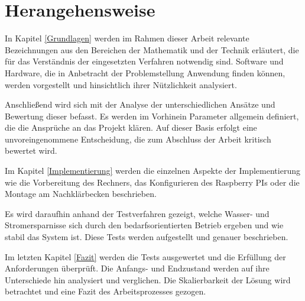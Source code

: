 \section{Herangehensweise}


In Kapitel \ref{Grundlagen} werden im Rahmen dieser Arbeit relevante Bezeichnungen aus den Bereichen der Mathematik und der Technik erläutert, die für das Verständnis der eingesetzten Verfahren notwendig sind. Software und Hardware, die in Anbetracht der Problemstellung Anwendung finden können, werden vorgestellt und hinsichtlich ihrer Nützlichkeit analysiert.

Anschließend wird sich mit der Analyse der unterschiedlichen Ansätze und Bewertung dieser befasst. Es werden im Vorhinein Parameter allgemein definiert, die die Ansprüche an das Projekt klären. Auf dieser Basis erfolgt eine unvoreingenommene Entscheidung, die zum Abschluss der Arbeit kritisch bewertet wird. 

Im Kapitel \ref{Implementierung} werden die einzelnen Aspekte der Implementierung wie die Vorbereitung des Rechners, das Konfigurieren des Raspberry PIs oder die Montage am Nachklärbecken beschrieben.  
 
Es wird daraufhin anhand der Testverfahren gezeigt, welche Wasser- und Stromersparnisse sich durch den bedarfsorientierten Betrieb ergeben und wie stabil das System ist. Diese Tests werden aufgestellt und genauer beschrieben.

Im letzten Kapitel \ref{Fazit} werden die Tests ausgewertet und die Erfüllung der Anforderungen überprüft. Die Anfangs- und Endzustand werden auf ihre Unterschiede hin analysiert und verglichen. Die Skalierbarkeit der Lösung wird betrachtet und eine Fazit des Arbeitsprozesses gezogen. 







